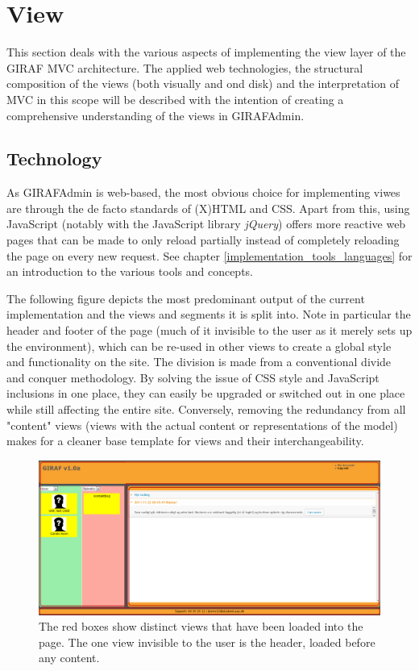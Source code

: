 \section{View}
\label{view}
This section deals with the various aspects of implementing the view layer of the GIRAF MVC architecture. The applied web technologies, the structural composition of the views (both visually and ond disk) and the interpretation of MVC in this scope will be described with the intention of creating a comprehensive understanding of the views in GIRAFAdmin.

\subsection{Technology}
As GIRAFAdmin is web-based, the most obvious choice for implementing viwes are through the de facto standards of (X)HTML and CSS. Apart from this, using JavaScript (notably with the JavaScript library \emph{jQuery}) offers more reactive web pages that can be made to only reload partially instead of completely reloading the page on every new request. See chapter \vref{implementation_tools_languages} for an introduction to the various tools and concepts.

The following figure depicts the most predominant output of the current implementation and the views and segments it is split into. Note in particular the header and footer of the page (much of it invisible to the user as it merely sets up the environment), which can be re-used in other views to create a global style and functionality on the site. The division is made from a conventional divide and conquer methodology. By solving the issue of CSS style and JavaScript inclusions in one place, they can easily be upgraded or switched out in one place while still affecting the entire site. Conversely, removing the redundancy from all "content" views (views with the actual content or representations of the model) makes for a cleaner base template for views and their interchangeability.

\begin{figure}
    \begin{center}
    \includegraphics[scale=0.45,angle=90]{img/mvc_details/mvc_detailed_views}
    \caption{\label{implementation_view_views1}The red boxes show distinct views that have been loaded into the page. The one view invisible to the user is the header, loaded before any content.}
    \end{center}
\end{figure}

